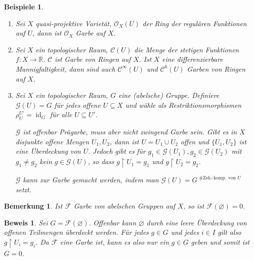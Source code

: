 \documentclass[a4paper,oneside]{scrbook}
\theoremstyle{break}
\newtheorem{Bem}[Def]{Bemerkung}
\newtheorem{Bsp}[Def]{Beispiele}
\theoremstyle{nonumberbreak}
\theoremstyle{nonumberplain}
\newtheorem{Bew}{Beweis}
\theoremstyle{break}
\renewcommand{\emptyset}{%
	\ensuremath{\varnothing}%
}
\newcommand{\RR}{%
	\ensuremath{\mathbb{R}}%
}
\DeclareMathOperator{\id}{id}
\begin{document}
\begin{Bsp}
	\begin{enumerate}
		\item Sei $X$ quasi-projektive Varietät, $\mathcal{O}_X(U)$ der Ring der regulären Funktionen auf $U$,
		dann ist $\mathcal{O}_X$ Garbe auf $X$.
		\item Sei $X$ ein topologischer Raum, $\mathcal{C}(U)$ die Menge der stetigen Funktionen $f\colon X \to \RR$.
		$\mathcal{C}$ ist Garbe von Ringen auf $X$.
		Ist $X$ eine differenzierbare Mannigfaltigkeit, dann sind auch $\mathcal{C}^{\infty}(U)$ und $\mathcal{C}^{k}(U)$ Garben von Ringen auf $X$.
		\item Sei $X$ ein topologischer Raum, $G$ eine (abelsche) Gruppe. Definiere $\mathcal{G}(U) = G$ für jedes offene $U \subseteq X$ 
		und wähle als Restriktionsmorphismen $\rho_{U}^{U'} = \id_G$ für alle $U\subseteq U'$.

		$\mathcal{G}$ ist offenbar Prägarbe, muss aber nicht zwingend Garbe sein. Gibt es in $X$ disjunkte offene Mengen $U_1,U_2$, dann ist $U = U_1 \cup U_2$ offen und $\{ U_1, U_2 \}$ ist eine Überdeckung von $U$. Jedoch gibt es für $g_1 \in \mathcal{G}(U_1), g_2 \in \mathcal{G}(U_2)$ mit $g_1 \neq g_2$ kein $g \in \mathcal{G}(U)$, so dass $g\restriction U_1 = g_1$ und $g\restriction U_2 = g_2$.

		$\mathcal{G}$ kann zur Garbe gemacht werden, indem man $\mathcal{G}(U) = G^{ \text{ \#Zsh.-komp. von }U}$ setzt.
	\end{enumerate}
\end{Bsp}



\begin{Bem}\label{rem:sheaf_0}
	Ist $\mathcal{F}$ Garbe von abelschen Gruppen auf $X$, so ist $\mathcal{F}(\emptyset) = 0$.
\end{Bem}
\begin{Bew}
	Sei $G = \mathcal{F}(\emptyset)$. Offenbar kann $\emptyset$ durch eine leere Überdeckung von offenen Teilmengen überdeckt werden.
	Für jedes $g \in G$ und jedes $i\in I$ gilt also $g\restriction U_i = g_i$. Da $\mathcal{F}$ eine Garbe ist, kann es also nur
	ein $g \in G$ geben und somit ist $G = 0$.
\end{Bew}
\end{document}
